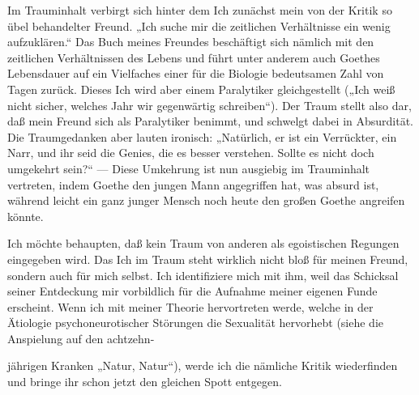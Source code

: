 \documentclass{article}
\begin{document}
            
        \pstart
        Im Trauminhalt verbirgt sich hinter dem Ich zunächst mein von der Kritik so übel
               behandelter Freund. „Ich suche mir die zeitlichen
                  Verhältnisse ein wenig aufzuklären.“ Das Buch meines Freundes
               beschäftigt sich nämlich mit den
               zeitlichen Verhältnissen des Lebens und führt unter
               anderem auch Goethes Lebensdauer auf ein
               Vielfaches einer für die Biologie bedeutsamen Zahl von Tagen zurück. Dieses Ich
               wird aber einem Paralytiker gleichgestellt („Ich weiß
                  nicht sicher, welches Jahr wir gegenwärtig schreiben“). Der Traum stellt
               also dar, daß mein Freund sich als Paralytiker benimmt, und schwelgt
               dabei in Absurdität. Die Traumgedanken aber lauten ironisch: „Natürlich, er ist
               ein Verrückter, ein Narr, und ihr seid die Genies, die es besser verstehen.
               Sollte es nicht doch umgekehrt sein?“ — Diese
                  Umkehrung ist nun ausgiebig im Trauminhalt
               vertreten, indem Goethe den jungen Mann
               angegriffen hat, was absurd ist, während leicht ein ganz junger Mensch noch
               heute den großen Goethe angreifen könnte.
        \pend
    
            
        \pstart
        Ich möchte behaupten, daß kein Traum von anderen als egoistischen Regungen
               eingegeben wird. Das Ich im Traum steht wirklich nicht bloß für meinen Freund,
               sondern auch für mich selbst. Ich identifiziere mich mit ihm, weil das Schicksal
               seiner Entdeckung mir vorbildlich für die Aufnahme meiner eigenen Funde erscheint. Wenn ich mit meiner
               Theorie hervortreten werde, welche in der Ätiologie psychoneurotischer Störungen
               die Sexualität hervorhebt (siehe die Anspielung auf den achtzehn-
        \pend
    
         
            
            
            
        \pstart
        jährigen Kranken „Natur, Natur“), werde
               ich die nämliche Kritik wiederfinden und bringe ihr schon jetzt den gleichen
               Spott entgegen.
        \pend
    
\end{document}
